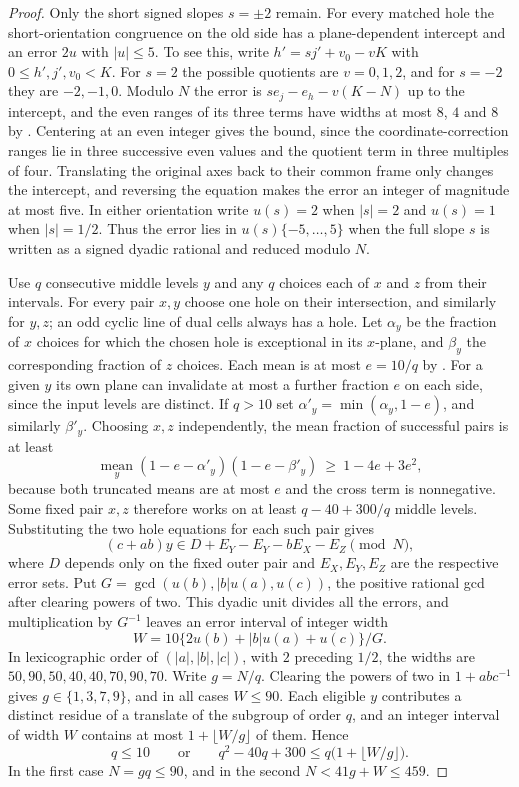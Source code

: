 \documentclass[11pt,colorlinks]{charlie}
\begin{document}
\begin{proof}
Only the short signed slopes $s=\pm2$ remain. For every matched hole the short-orientation congruence on the old side has a plane-dependent intercept and an error $2u$ with $|u|\le5$. To see this, write $h'=sj'+v_0-vK$ with $0\le h',j',v_0<K$. For $s=2$ the possible quotients are $v=0,1,2$, and for $s=-2$ they are $-2,-1,0$. Modulo $N$ the error is $se_j-e_h-v(K-N)$ up to the intercept, and the even ranges of its three terms have widths at most $8$, $4$ and $8$ by . Centering at an even integer gives the bound, since the coordinate-correction ranges lie in three successive even values and the quotient term in three multiples of four. Translating the original axes back to their common frame only changes the intercept, and reversing the equation makes the error an integer of magnitude at most five. In either orientation write $u(s)=2$ when $|s|=2$ and $u(s)=1$ when $|s|=1/2$. Thus the error lies in $u(s)\{-5,\ldots,5\}$ when the full slope $s$ is written as a signed dyadic rational and reduced modulo $N$.

Use $q$ consecutive middle levels $y$ and any $q$ choices each of $x$ and $z$ from their intervals. For every pair $x,y$ choose one hole on their intersection, and similarly for $y,z$; an odd cyclic line of dual cells always has a hole. Let $\alpha_y$ be the fraction of $x$ choices for which the chosen hole is exceptional in its $x$-plane, and $\beta_y$ the corresponding fraction of $z$ choices. Each mean is at most $e=10/q$ by . For a given $y$ its own plane can invalidate at most a further fraction $e$ on each side, since the input levels are distinct. If $q>10$ set $\alpha'_y=\min(\alpha_y,1-e)$, and similarly $\beta'_y$. Choosing $x,z$ independently, the mean fraction of successful pairs is at least
\[
 \operatorname*{mean}_y(1-e-\alpha'_y)(1-e-\beta'_y)\ \ge\ 1-4e+3e^2,
\]
because both truncated means are at most $e$ and the cross term is nonnegative. Some fixed pair $x,z$ therefore works on at least $q-40+300/q$ middle levels. Substituting the two hole equations for each such pair gives
\[
 (c+ab)y\in D+E_Y-E_Y-bE_X-E_Z\pmod N,
\]
where $D$ depends only on the fixed outer pair and $E_X,E_Y,E_Z$ are the respective error sets. Put $G=\gcd(u(b),|b|u(a),u(c))$, the positive rational gcd after clearing powers of two. This dyadic unit divides all the errors, and multiplication by $G^{-1}$ leaves an error interval of integer width
\[
 W=10\{2u(b)+|b|u(a)+u(c)\}/G .
\]
In lexicographic order of $(|a|,|b|,|c|)$, with $2$ preceding $1/2$, the widths are $50,90,50,40,40,70,90,70$. Write $g=N/q$. Clearing the powers of two in $1+abc^{-1}$ gives $g\in\{1,3,7,9\}$, and in all cases $W\le90$. Each eligible $y$ contributes a distinct residue of a translate of the subgroup of order $q$, and an integer interval of width $W$ contains at most $1+\lfloor W/g\rfloor$ of them. Hence
\[
 q\le10\qquad\text{or}\qquad q^2-40q+300\le q\bigl(1+\lfloor W/g\rfloor\bigr).
\]
In the first case $N=gq\le90$, and in the second $N<41g+W\le459$.
\end{proof}
\end{document}
